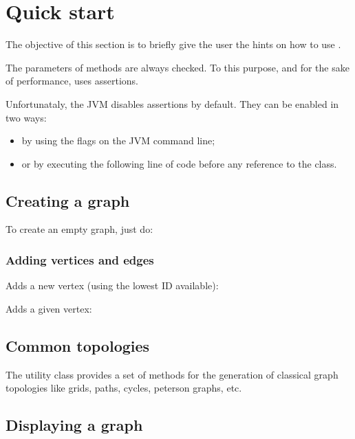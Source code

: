 \documentclass{article}
\begin{document}
\section{Quick start}

The objective of this section is to briefly give the user the hints on how to
use \grph.



	The  parameters of \grph methods are always checked. To
	this purpose, and for the sake of performance, \grph uses assertions. 
	
	Unfortunataly, the JVM disables assertions by default. They can be enabled in two ways:
	
	\begin{itemize}
  \item by using the  flags on the JVM command line;
  \item or by executing the following line of code before any reference to the
   class.
\end{itemize}


\subsection{Creating a graph}

To create an empty graph, just do:



\subsubsection{Adding vertices and edges}

Adds a new vertex (using the lowest ID available):



Adds a given vertex:




\subsection{Common topologies}

The utility class  provides a set of methods for the generation of classical
graph topologies like grids, paths, cycles, peterson graphs, etc.


\subsection{Displaying a graph}
\end{document}
